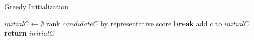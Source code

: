 
\begin{algorithm}[th]
\caption{Greedy Initialization}
\label{initialization}
\begin{algorithmic}[1]
\State $initialC \leftarrow \emptyset$
\State rank $candidateC$ by representative score
\State \textbf{break}
\EndIf
{}
\State add $c$ to $initialC$
\EndIf
\EndFor
\State \textbf{return} $initialC$
\EndFunction
\end{algorithmic}
\end{algorithm}

